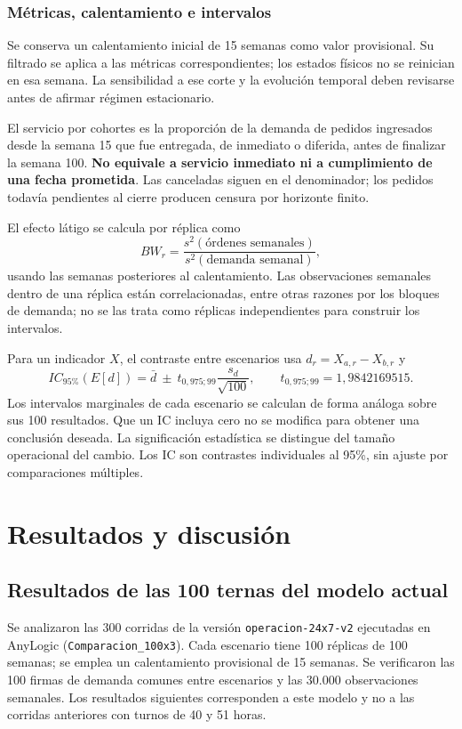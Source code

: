 \documentclass[11pt, a4paper]{article}
\begin{document}
\subsubsection{Métricas, calentamiento e intervalos}
Se conserva un calentamiento inicial de 15 semanas como valor provisional. Su filtrado se aplica a las métricas correspondientes; los estados físicos no se reinician en esa semana. La sensibilidad a ese corte y la evolución temporal deben revisarse antes de afirmar régimen estacionario.

El servicio por cohortes es la proporción de la demanda de pedidos ingresados desde la semana 15 que fue entregada, de inmediato o diferida, antes de finalizar la semana 100. \textbf{No equivale a servicio inmediato ni a cumplimiento de una fecha prometida}. Las canceladas siguen en el denominador; los pedidos todavía pendientes al cierre producen censura por horizonte finito.

El efecto látigo se calcula por réplica como
\begin{equation}
    BW_r=\frac{s^2(\text{órdenes semanales})}{s^2(\text{demanda semanal})},
\end{equation}
usando las semanas posteriores al calentamiento. Las observaciones semanales dentro de una réplica están correlacionadas, entre otras razones por los bloques de demanda; no se las trata como réplicas independientes para construir los intervalos.

Para un indicador $X$, el contraste entre escenarios usa $d_r=X_{a,r}-X_{b,r}$ y
\begin{equation}
    IC_{95\%}(E[d])=\bar d\ \pm\ t_{0,975;99}\frac{s_d}{\sqrt{100}},
    \qquad t_{0,975;99}=1,9842169515.
\end{equation}
Los intervalos marginales de cada escenario se calculan de forma análoga sobre sus 100 resultados. Que un IC incluya cero no se modifica para obtener una conclusión deseada. La significación estadística se distingue del tamaño operacional del cambio. Los IC son contrastes individuales al 95\%, sin ajuste por comparaciones múltiples.

\section{Resultados y discusión}
\subsection{Resultados de las 100 ternas del modelo actual}
Se analizaron las 300 corridas de la versión
\texttt{operacion-24x7-v2} ejecutadas en AnyLogic (\texttt{Comparacion\_100x3}). Cada escenario tiene 100 réplicas de 100 semanas;
se emplea un calentamiento provisional de 15 semanas. Se verificaron las 100
firmas de demanda comunes entre escenarios y las 30.000 observaciones semanales.
Los resultados siguientes corresponden a este modelo y no a las corridas anteriores
con turnos de 40 y 51 horas.
\end{document}
